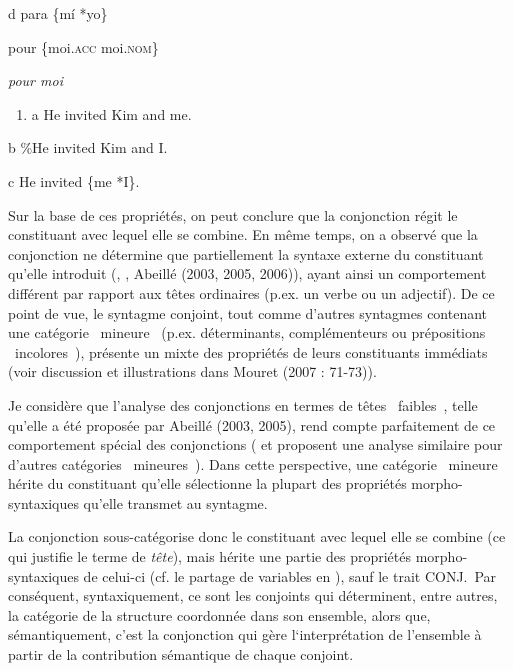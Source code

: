   d  para  \{mí  {\textbar} *yo\}

    pour  \{moi.\textsc{acc  {\textbar}} moi.\textsc{nom\}}

{\itshape
pour moi}


\begin{enumerate}
\item \label{bkm:Ref301786194}a  He invited Kim and me.


\end{enumerate}
  b  \%He invited Kim and I.

  c  He invited \{me {\textbar} *I\}.

Sur la base de ces propriétés, on peut conclure que la conjonction régit le constituant avec lequel elle se combine. En même temps, on a observé que la conjonction ne détermine que partiellement la syntaxe externe du constituant qu'elle introduit (\citet{Paritong1992}, \citet{Johannessen1998}, Abeillé (2003, 2005, 2006)), ayant ainsi un comportement différent par rapport aux têtes ordinaires (p.ex. un verbe ou un adjectif). De ce point de vue, le syntagme conjoint, tout comme d'autres syntagmes contenant une catégorie {\guillemotleft}~mineure~{\guillemotright} (p.ex. déterminants, complémenteurs ou prépositions {\guillemotleft}~incolores~{\guillemotright}), présente un mixte des propriétés de leurs constituants immédiats (voir discussion et illustrations dans Mouret (2007 : 71-73)). 

Je considère que l'analyse des conjonctions en termes de têtes {\guillemotleft}~faibles~{\guillemotright}, telle qu'elle a été proposée par Abeillé (2003, 2005), rend compte parfaitement de ce comportement spécial des conjonctions (\citet{Sag1997} et \citet{Tseng2002} proposent une analyse similaire pour d'autres catégories {\guillemotleft}~mineures~{\guillemotright}). Dans cette perspective, une catégorie {\guillemotleft}~mineure~{\guillemotright} hérite du constituant qu'elle sélectionne la plupart des propriétés morpho-syntaxiques qu'elle transmet au syntagme. 

La conjonction sous-catégorise donc le constituant avec lequel elle se combine (ce qui justifie le terme de \textit{tête}), mais hérite une partie des propriétés morpho-syntaxiques de celui-ci (cf. le partage de variables en ), sauf le trait CONJ.~Par conséquent, syntaxiquement, ce sont les conjoints qui déterminent, entre autres, la catégorie de la structure coordonnée dans son ensemble, alors que, sémantiquement, c'est la conjonction qui gère l`interprétation de l'ensemble à partir de la contribution sémantique de chaque conjoint.

